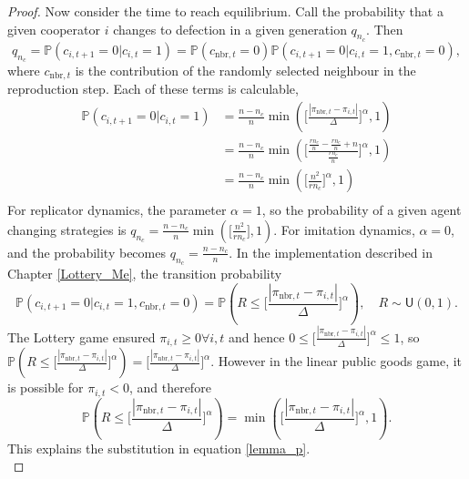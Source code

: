 \begin{proof}
Now consider the time to reach equilibrium. Call the probability that a given cooperator $i$ changes to defection in a given generation $q_{n_c}$. Then  $$q_{n_c} = \mathbb P(c_{i,t+1} = 0 | c_{i,t} = 1) = \mathbb P(c_{\text{nbr},t} = 0)\mathbb P (c_{i,t+1} = 0 | c_{i,t} =1, c_{\text{nbr}, t}=0), $$ where $c_{\text{nbr},t}$ is the contribution of the randomly selected neighbour in the reproduction step. Each of these terms is calculable, \\
\begin{align}  \label{lemma_p}
    \mathbb P(c_{i,t+1} = 0 | c_{i,t} = 1) &= \frac{n-n_c}{n} \min( \Bigg[\frac{|\pi_{\text{nbr},t} - \pi_{i,t}|}{\Delta} \Bigg]^\alpha, 1)\\
    &= \frac{n-n_c}{n} \min(\Bigg[ \frac{\tfrac{rn_c}{n} - \tfrac{rn_c}{n} +n}{\tfrac{rn_c}{n}} \Bigg]^\alpha, 1) \nonumber\\
    &= \frac{n-n_c}{n}\min(\Bigg[ \frac{n^2}{rn_c} \Bigg]^\alpha,1) \nonumber\\ \nonumber
\end{align}
For replicator dynamics, the parameter $\alpha = 1$, so the probability of a given agent changing strategies is $ q_{n_c} = \frac{n-n_c}{n}\min(\Bigg[ \frac{n^2}{rn_c} \Bigg],1)$. For imitation dynamics, $\alpha = 0$, and the probability becomes $q_{n_c} = \frac{n-n_c}{n}$. In the implementation described in Chapter \ref{Lottery_Me}, the transition probability $$\mathbb P (c_{i,t+1} = 0 | c_{i,t} =1, c_{\text{nbr}, t}=0) = \mathbb P (R \leq \Bigg[\frac{|\pi_{\text{nbr},t} - \pi_{i,t}|}{\Delta} \Bigg]^\alpha), \quad R  \sim \mathsf{U}(0,1).$$ The Lottery game ensured $\pi_{i,t}\geq 0 \forall i,t$ and hence $ 0 \leq \Big[\frac{|\pi_{\text{nbr},t} - \pi_{i,t}|}{\Delta} \Big]^\alpha \leq 1$, so $\mathbb P (R \leq \Big[\frac{|\pi_{\text{nbr},t} - \pi_{i,t}|}{\Delta} \Big]^\alpha) = \Big[\frac{|\pi_{\text{nbr},t} - \pi_{i,t}|}{\Delta} \Big]^\alpha$. However in the linear public goods game, it is possible for $\pi_{i,t}< 0$, and therefore $$\mathbb P (R \leq \Big[\frac{|\pi_{\text{nbr},t} - \pi_{i,t}|}{\Delta} \Big]^\alpha) = \min(\Big[\frac{|\pi_{\text{nbr},t} - \pi_{i,t}|}{\Delta} \Big]^\alpha, 1). $$ This explains the substitution in equation \eqref{lemma_p}.   \\


\end{proof}
